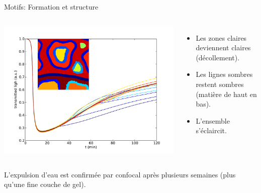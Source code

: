\documentclass{beamer}
\begin{document}
\begin{frame}{Motifs: Formation et structure}
\begin{columns}
\includegraphics[width=\textwidth]{intensities_by_zones.pdf}
\begin{itemize}
\item Les zones claires deviennent claires (décollement).
\item Les lignes sombres restent sombres (matière de haut en bas).
\item L'ensemble s’éclaircit.
\end{itemize}
\end{columns}
L'expulsion d'eau est confirmée par confocal après plusieurs semaines (plus qu'une fine couche de gel).
\end{frame}
\end{document}
